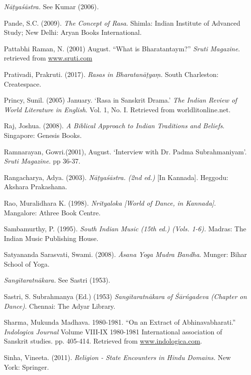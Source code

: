 \begin{thebibliography}{99}
  \textit{Nāṭyaśāstra. }See Kumar (2006)\textit{.}

  Pande, S.C. (2009). \textit{The Concept of Rasa}. Shimla: Indian Institute of Advanced Study; New Delhi: Aryan Books International.

  Pattabhi Raman, N. (2001) August. “What is Bharatantaym?” \textit{Sruti Magazine}. retrieved from \url{www.sruti.com}

  Prativadi, Prakruti. (2017). \textit{Rasas in Bharatanāṭyaṃ. }South Charleston: Createspace.

  Princy, Sunil. (2005) January. ‘Rasa in Sanskrit Drama.’ \textit{The Indian Review of World Literature in English}. Vol. 1, No. I. Retrieved from worldlitonline.net.

  Raj, Joshua. (2008). \textit{A Biblical Approach to Indian Traditions and Beliefs}. Singapore: Genesis Books.

  Ramnarayan, Gowri.(2001), August. ‘Interview with Dr. Padma Subrahmaniyam’. \textit{Sruti Magazine}. pp 36-37.

  Rangacharya, Adya. (2003). \textit{Nāṭyaśāstra. (2nd ed.) }[In Kannada]. Heggodu: Akshara Prakashana.

  Rao, Muralidhara K. (1998). \textit{Nrityaloka [World of Dance, in Kannada]}. Mangalore: Athree Book Centre.

  Sambamurthy, P. (1995). \textit{South Indian Music (15th ed.) (Vols. 1-6). }Madras: The Indian Music Publishing House.

  Satyananda Sarasvati, Swami. (2008). \textit{Āsana Yoga Mudra Bandha}. Munger: Bihar School of Yoga.

  \textit{Sangītaratnākara. }See\textit{ }Sastri (1953).

  Sastri, S. Subrahmanya (Ed.) (1953) \textit{Sangītaratnākara of Śārńgadeva (Chapter on Dance)}. Chennai: The Adyar Library.

  Sharma, Mukunda Madhava. 1980-1981. “On an Extract of Abhinavabharati.” \textit{Indologica Journal} Volume VIII-IX 1980-1981 International association of Sanskrit studies. pp. 405-414. Retrieved from \url{www.indologica.com}.

  Sinha, Vineeta. (2011). \textit{Religion - State Encounters in Hindu Domains.} New York: Springer.


\end{thebibliography}
